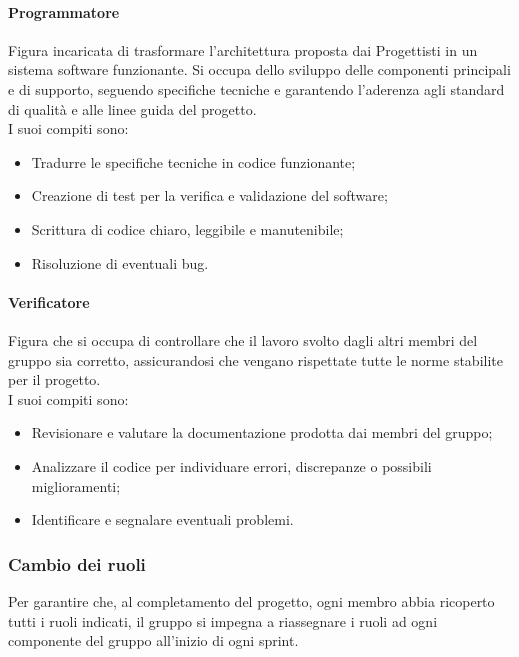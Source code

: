 \documentclass[10pt]{article}
\begin{document}
\begin{justify}
        \paragraph{Programmatore}
        Figura incaricata di trasformare l'architettura proposta dai Progettisti in un sistema software funzionante. Si occupa dello sviluppo delle componenti principali e di supporto, seguendo specifiche tecniche e garantendo l'aderenza agli standard di qualità e alle linee guida del progetto.\\
        I suoi compiti sono:
        \begin{itemize}
            \item Tradurre le specifiche tecniche in codice funzionante;
            \item Creazione di test per la verifica e validazione del software;
            \item Scrittura di codice chiaro, leggibile e manutenibile;
            \item Risoluzione di eventuali bug.
        \end{itemize}

        \paragraph{Verificatore}
        Figura che si occupa di controllare che il lavoro svolto dagli altri membri del gruppo sia corretto, assicurandosi che vengano rispettate tutte le norme stabilite per il progetto.\\
        I suoi compiti sono:
        \begin{itemize}
            \item Revisionare e valutare la documentazione prodotta dai membri del gruppo;
            \item Analizzare il codice per individuare errori, discrepanze o possibili miglioramenti;
            \item Identificare e segnalare eventuali problemi.
        \end{itemize}

    \subsubsection{Cambio dei ruoli}
    Per garantire che, al completamento del progetto, ogni membro abbia ricoperto tutti i ruoli indicati, il gruppo si impegna a riassegnare i ruoli ad ogni componente del gruppo all'inizio di ogni sprint.


\end{justify}
\end{document}
